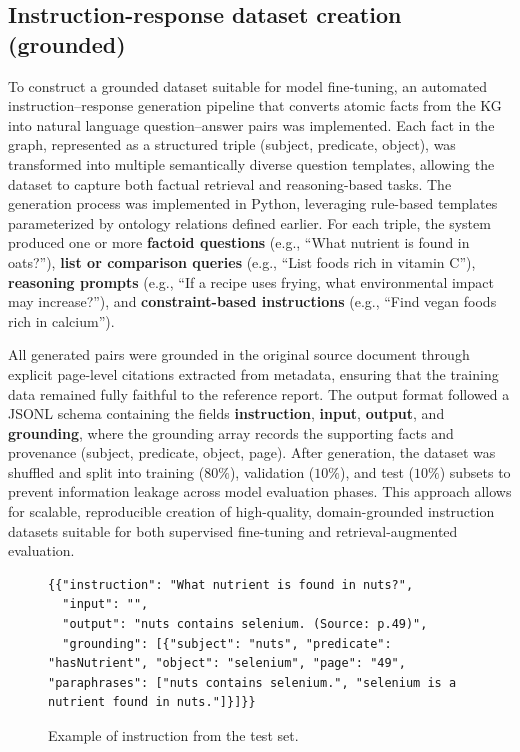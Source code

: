 \subsection{Instruction-response dataset creation (grounded)}
To construct a grounded dataset suitable for model fine-tuning, an automated instruction–response generation pipeline that converts atomic facts from the KG into natural language question–answer pairs was implemented. Each fact in the graph, represented as a structured triple (subject, predicate, object), was transformed into multiple semantically diverse question templates, allowing the dataset to capture both factual retrieval and reasoning-based tasks. The generation process was implemented in Python, leveraging rule-based templates parameterized by ontology relations defined earlier. For each triple, the system produced one or more \textbf{factoid questions} (e.g., “What nutrient is found in oats?”), \textbf{list or comparison queries} (e.g., “List foods rich in vitamin C”), \textbf{reasoning prompts} (e.g., “If a recipe uses frying, what environmental impact may increase?”), and \textbf{constraint-based instructions} (e.g., “Find vegan foods rich in calcium”).

All generated pairs were grounded in the original source document through explicit page-level citations extracted from metadata, ensuring that the training data remained fully faithful to the reference report. The output format followed a JSONL schema containing the fields \textbf{instruction}, \textbf{input}, \textbf{output}, and \textbf{grounding}, where the grounding array records the supporting facts and provenance (subject, predicate, object, page). After generation, the dataset was shuffled and split into training ($80 \%$), validation ($10 \%$), and test ($10 \%$) subsets to prevent information leakage across model evaluation phases. This approach allows for scalable, reproducible creation of high-quality, domain-grounded instruction datasets suitable for both supervised fine-tuning and retrieval-augmented evaluation.

\begin{figure}[h!]
\centering
\begin{lstlisting}
{{"instruction": "What nutrient is found in nuts?", 
  "input": "", 
  "output": "nuts contains selenium. (Source: p.49)", 
  "grounding": [{"subject": "nuts", "predicate": "hasNutrient", "object": "selenium", "page": "49", "paraphrases": ["nuts contains selenium.", "selenium is a nutrient found in nuts."]}]}}
\end{lstlisting}
\caption{Example of instruction from the test set.}
\label{fig:instruction_example}
\end{figure}


